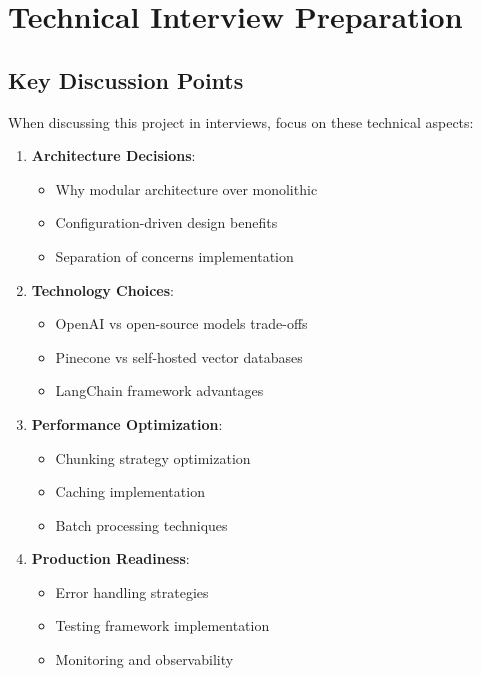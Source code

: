 \documentclass[12pt,a4paper]{article}
\begin{document}
\section{Technical Interview Preparation}

\subsection{Key Discussion Points}

When discussing this project in interviews, focus on these technical aspects:

\begin{enumerate}
    \item \textbf{Architecture Decisions}:
    \begin{itemize}
        \item Why modular architecture over monolithic
        \item Configuration-driven design benefits
        \item Separation of concerns implementation
    \end{itemize}
    
    \item \textbf{Technology Choices}:
    \begin{itemize}
        \item OpenAI vs open-source models trade-offs
        \item Pinecone vs self-hosted vector databases
        \item LangChain framework advantages
    \end{itemize}
    
    \item \textbf{Performance Optimization}:
    \begin{itemize}
        \item Chunking strategy optimization
        \item Caching implementation
        \item Batch processing techniques
    \end{itemize}
    
    \item \textbf{Production Readiness}:
    \begin{itemize}
        \item Error handling strategies
        \item Testing framework implementation
        \item Monitoring and observability
    \end{itemize}
\end{enumerate}
\end{document}
